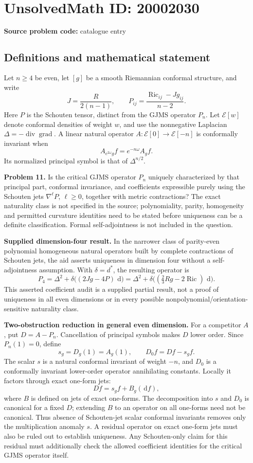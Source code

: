 \documentclass[11pt]{article}
\newcommand{\dd}{\,\mathrm{d}}
\begin{document}
\section*{UnsolvedMath ID: 20002030}
\textbf{Source problem code:} catalogue entry
\subsection{Definitions and mathematical statement}
Let $n\ge4$ be even, let $[g]$ be a smooth Riemannian conformal structure, and write
\[
 J=\frac{R}{2(n-1)},\qquad
 P_{ij}=\frac{\operatorname{Ric}_{ij}-Jg_{ij}}{n-2}.
\]
Here $P$ is the Schouten tensor, distinct from the GJMS operator $P_n$. Let $\mathcal E[w]$ denote conformal densities of weight $w$, and use the nonnegative Laplacian $\Delta=-\operatorname{div}\operatorname{grad}$. A linear natural operator $A:\mathcal E[0]\to\mathcal E[-n]$ is conformally invariant when
\[
 A_{e^{2\omega}g}f=e^{-n\omega}A_gf.
\]
Its normalized principal symbol is that of $\Delta^{n/2}$.

\textbf{Problem 11.} Is the critical GJMS operator $P_n$ uniquely characterized by that principal part, conformal invariance, and coefficients expressible purely using the Schouten jets $\nabla^\ell P$, $\ell\ge0$, together with metric contractions? The exact naturality class is not specified in the source; polynomiality, parity, homogeneity and permitted curvature identities need to be stated before uniqueness can be a definite classification. Formal self-adjointness is not included in the question.

\textbf{Supplied dimension-four result.} In the narrower class of parity-even polynomial homogeneous natural operators built by complete contractions of Schouten jets, the aid asserts uniqueness in dimension four without a self-adjointness assumption. With $\delta=d^*$, the resulting operator is
\[
 P_4=\Delta^2+\delta\bigl((2Jg-4P)\,\dd\bigr)
     =\Delta^2+\delta\bigl((\tfrac23Rg-2\operatorname{Ric})\,\dd\bigr).
\]
This asserted coefficient audit is a supplied partial result, not a proof of uniqueness in all even dimensions or in every possible nonpolynomial/orientation-sensitive naturality class.

\textbf{Two-obstruction reduction in general even dimension.} For a competitor $A$, put $D=A-P_n$. Cancellation of principal symbols makes $D$ lower order. Since $P_n(1)=0$, define
\[
 s_g=D_g(1)=A_g(1),\qquad D_0f=Df-s_gf.
\]
The scalar $s$ is a natural conformal invariant of weight $-n$, and $D_0$ is a conformally invariant lower-order operator annihilating constants. Locally it factors through exact one-form jets:
\[
 Df=s_gf+B_g(\dd f),
\]
where $B$ is defined on jets of exact one-forms. The decomposition into $s$ and $D_0$ is canonical for a fixed $D$; extending $B$ to an operator on all one-forms need not be canonical. Thus absence of Schouten-jet scalar conformal invariants removes only the multiplication anomaly $s$. A residual operator on exact one-form jets must also be ruled out to establish uniqueness. Any Schouten-only claim for this residual must additionally check the allowed coefficient identities for the critical GJMS operator itself.
\end{document}
